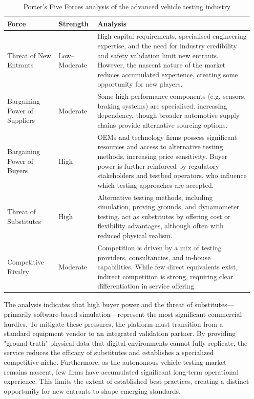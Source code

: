 \begin{table}[h]
\centering
\caption{Porter’s Five Forces analysis of the advanced vehicle testing industry}
\footnotesize
\singlespacing
\begin{tabularx}{\textwidth}{|p{3.5cm}|p{1.7cm}|X|}
\hline
\textbf{Force} & \textbf{Strength} & \textbf{Analysis} \\
\hline
Threat of New Entrants & Low--Moderate & High capital requirements, specialised engineering expertise, and the need for industry credibility and safety validation limit new entrants. However, the nascent nature of the market reduces accumulated experience, creating some opportunity for new players. \\
\hline
Bargaining Power of Suppliers & Moderate & Some high-performance components (e.g. sensors, braking systems) are specialised, increasing dependency, though broader automotive supply chains provide alternative sourcing options. \\
\hline
Bargaining Power of Buyers & High & OEMs and technology firms possess significant resources and access to alternative testing methods, increasing price sensitivity. Buyer power is further reinforced by regulatory stakeholders and testbed operators, who influence which testing approaches are accepted. \\
\hline
Threat of Substitutes & High & Alternative testing methods, including simulation, proving grounds, and dynamometer testing, act as substitutes by offering cost or flexibility advantages, although often with reduced physical realism. \\
\hline
Competitive Rivalry & Moderate & Competition is driven by a mix of testing providers, consultancies, and in-house capabilities. While few direct equivalents exist, indirect competition is strong, requiring clear differentiation in service offering. \\
\hline
\end{tabularx}
\end{table}

The analysis indicates that high buyer power and the threat of substitutes—primarily software-based simulation—represent the most significant commercial hurdles. To mitigate these pressures, the platform must transition from a standard equipment vendor to an integrated validation partner. By providing "ground-truth" physical data that digital environments cannot fully replicate, the service reduces the efficacy of substitutes and establishes a specialized competitive niche. Furthermore, as the autonomous vehicle testing market remains nascent, few firms have accumulated significant long-term operational experience. This limits the extent of established best practices, creating a distinct opportunity for new entrants to shape emerging standards.

